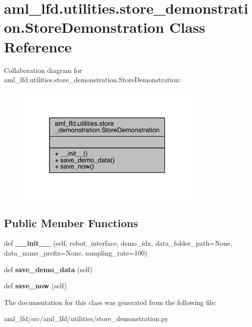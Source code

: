 \hypertarget{classaml__lfd_1_1utilities_1_1store__demonstration_1_1_store_demonstration}{}\section{aml\+\_\+lfd.\+utilities.\+store\+\_\+demonstration.\+Store\+Demonstration Class Reference}
\label{classaml__lfd_1_1utilities_1_1store__demonstration_1_1_store_demonstration}


Collaboration diagram for aml\+\_\+lfd.\+utilities.\+store\+\_\+demonstration.\+Store\+Demonstration\+:
\nopagebreak
\begin{figure}[H]
\begin{center}
\leavevmode
\includegraphics[width=257pt]{classaml__lfd_1_1utilities_1_1store__demonstration_1_1_store_demonstration__coll__graph}
\end{center}
\end{figure}
\subsection*{Public Member Functions}
\begin{DoxyCompactItemize}
\item 
\hypertarget{classaml__lfd_1_1utilities_1_1store__demonstration_1_1_store_demonstration_a345e5cbedf84f759586e600b60a8bc81}{}\label{classaml__lfd_1_1utilities_1_1store__demonstration_1_1_store_demonstration_a345e5cbedf84f759586e600b60a8bc81} 
def {\bfseries \+\_\+\+\_\+init\+\_\+\+\_\+} (self, robot\+\_\+interface, demo\+\_\+idx, data\+\_\+folder\+\_\+path=None, data\+\_\+name\+\_\+prefix=None, sampling\+\_\+rate=100)
\item 
\hypertarget{classaml__lfd_1_1utilities_1_1store__demonstration_1_1_store_demonstration_af712a5bc7ae0793a53700c1f123aaf5f}{}\label{classaml__lfd_1_1utilities_1_1store__demonstration_1_1_store_demonstration_af712a5bc7ae0793a53700c1f123aaf5f} 
def {\bfseries save\+\_\+demo\+\_\+data} (self)
\item 
\hypertarget{classaml__lfd_1_1utilities_1_1store__demonstration_1_1_store_demonstration_a626e68dbd7e29a25ca5f3d0496592884}{}\label{classaml__lfd_1_1utilities_1_1store__demonstration_1_1_store_demonstration_a626e68dbd7e29a25ca5f3d0496592884} 
def {\bfseries save\+\_\+now} (self)
\end{DoxyCompactItemize}


The documentation for this class was generated from the following file\+:\begin{DoxyCompactItemize}
\item 
aml\+\_\+lfd/src/aml\+\_\+lfd/utilities/store\+\_\+demonstration.\+py\end{DoxyCompactItemize}
